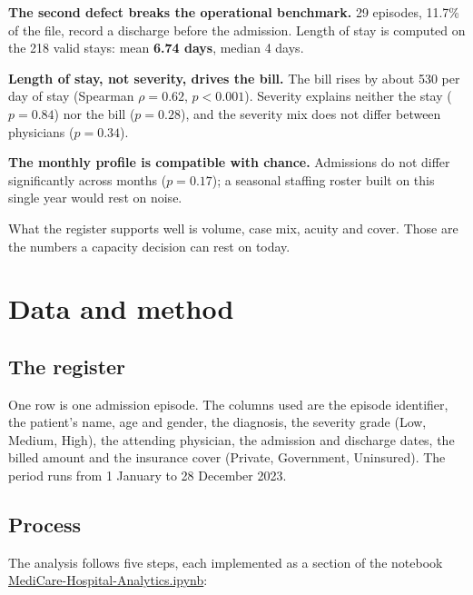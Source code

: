 \documentclass[12pt,a4paper]{article}
\newcommand{\F}[1]{{\small\url{#1}}}
\begin{document}
\textbf{The second defect breaks the operational benchmark.} 29 episodes, 11.7\% of
the file, record a discharge before the admission. Length of stay is computed on the
218 valid stays: mean \textbf{6.74 days}, median 4 days.

\textbf{Length of stay, not severity, drives the bill.} The bill rises by about 530
per day of stay (Spearman $\rho = 0.62$, $p < 0.001$). Severity explains neither the
stay ($p = 0.84$) nor the bill ($p = 0.28$), and the severity mix does not differ
between physicians ($p = 0.34$).

\textbf{The monthly profile is compatible with chance.} Admissions do not differ
significantly across months ($p = 0.17$); a seasonal staffing roster built on this
single year would rest on noise.

What the register supports well is volume, case mix, acuity and cover. Those are the
numbers a capacity decision can rest on today.

\section{Data and method}

\subsection{The register}

One row is one admission episode. The columns used are the episode identifier, the
patient's name, age and gender, the diagnosis, the severity grade (Low, Medium,
High), the attending physician, the admission and discharge dates, the billed amount
and the insurance cover (Private, Government, Uninsured). The period runs from
1 January to 28 December 2023.

\subsection{Process}

The analysis follows five steps, each implemented as a section of the notebook
\F{MediCare-Hospital-Analytics.ipynb}:
\end{document}
